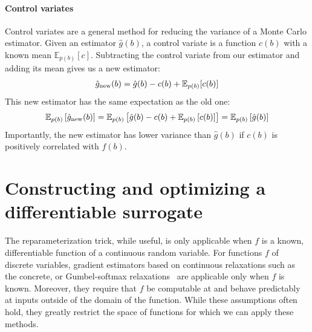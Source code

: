 \documentclass{article}
\newcommand{\controlf}{c}  %
\begin{document}
\paragraph{Control variates}
Control variates are a general method for reducing the variance of a Monte Carlo estimator.
Given an estimator $\hat g(b)$, a control variate is a function $\controlf(b)$ with a known mean $\mathbb{E}_{p(b)} [ \controlf ]$.
Subtracting the control variate from our estimator and adding its mean gives us a new estimator:
%
\begin{align}
\hat g_\textnormal{new}(b) = \hat g(b) - \controlf(b) + \mathbb{E}_{p(b)}[\controlf(b)]
\end{align}
%
This new estimator has the same expectation as the old one:
%
\begin{align}
\mathbb{E}_{p(b)}\left[\hat g_\textnormal{new}(b) \right] 
= \mathbb{E}_{p(b)}\left[\hat g(b) - \controlf(b) + \mathbb{E}_{p(b)} \left[ \controlf(b) \right] \right]
= \mathbb{E}_{p(b)}\left[ \hat g(b) \right]
\end{align}
%
Importantly, the new estimator has lower variance than $\hat g(b)$ if $\controlf(b)$ is positively correlated with $f(b)$.

\section{Constructing and optimizing a differentiable surrogate}
\label{lax section}
The reparameterization trick, while useful, is only applicable when $f$ is a known, differentiable function of a continuous random variable.
For functions $f$ of discrete variables, gradient estimators based on continuous relaxations such as the concrete, or Gumbel-softmax relaxations~\cite{maddison2016concrete, jang2016categorical} are applicable only when $f$ is known.
Moreover, they require that $f$ be computable at and behave predictably at inputs outside of the domain of the function.
While these assumptions often hold, they greatly restrict the space of functions for which we can apply these methods. 
\end{document}
